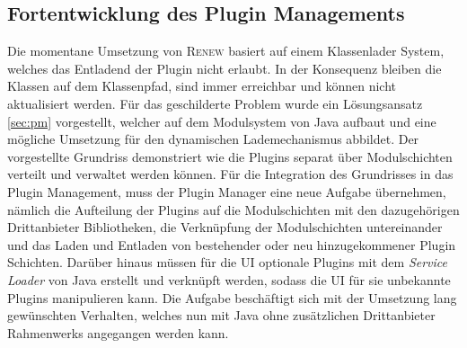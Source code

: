  \subsection{Fortentwicklung des Plugin Managements}
	Die momentane Umsetzung von \textsc{Renew} basiert auf einem Klassenlader System, welches das Entladend der Plugin nicht erlaubt. In der Konsequenz bleiben die Klassen auf dem Klassenpfad, sind immer erreichbar und können nicht aktualisiert werden. Für das geschilderte Problem wurde ein Lösungsansatz \ref{sec:pm} vorgestellt, welcher auf dem Modulsystem von Java aufbaut und eine mögliche Umsetzung für den dynamischen Lademechanismus abbildet. Der vorgestellte Grundriss demonstriert wie die Plugins separat über Modulschichten verteilt und verwaltet werden können.\newline
	Für die Integration des Grundrisses in das Plugin Management, muss der Plugin Manager eine neue Aufgabe übernehmen, nämlich die Aufteilung der Plugins auf die Modulschichten mit den dazugehörigen Drittanbieter Bibliotheken, die Verknüpfung der Modulschichten untereinander und das Laden und Entladen von bestehender oder neu hinzugekommener Plugin Schichten. Darüber hinaus müssen für die UI optionale Plugins mit dem \textit{Service Loader} von Java erstellt und verknüpft werden, sodass die UI für sie unbekannte Plugins manipulieren kann. \newline
	Die Aufgabe beschäftigt sich mit der Umsetzung lang gewünschten Verhalten, welches nun mit Java ohne zusätzlichen Drittanbieter Rahmenwerks angegangen werden kann. 





